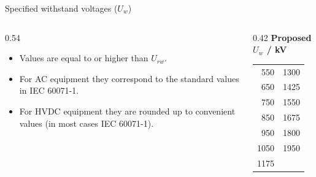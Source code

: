 \begin{frame}{Specified withstand voltages ($U_w$)}
  \begin{columns}[c,onlytextwidth]
    \begin{column}{0.54\textwidth}
      \begin{itemize}
        \setlength{\itemsep}{0.4em}
        \item Values are equal to or higher than $U_{rw}$.
        \item For AC equipment they correspond to the standard values in
              IEC 60071-1.
        \item For HVDC equipment they are rounded up to convenient values
              (in most cases IEC 60071-1).
      \end{itemize}
    \end{column}
    \begin{column}{0.42\textwidth}
      \centering
      \renewcommand{\arraystretch}{1.15}
      \textbf{Proposed $U_w$ / kV}\\[0.3em]
      \begin{tabular}{@{}rr@{}}
        \hline
        550  & 1300 \\
        650  & 1425 \\
        750  & 1550 \\
        850  & 1675 \\
        950  & 1800 \\
        1050 & 1950 \\
        1175 &      \\
        \hline
      \end{tabular}
    \end{column}
  \end{columns}
\end{frame}

